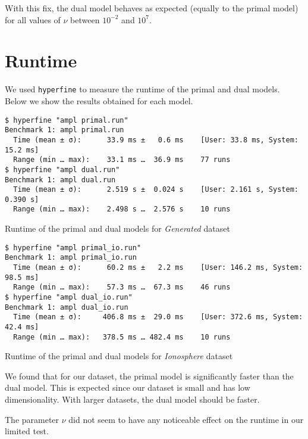 With this fix, the dual model behaves as expected (equally to the primal model)
for all values of $\nu$ between $10^{-2}$ and $10^{7}$.

\section{Runtime}

We used \texttt{hyperfine}%
\cite{peter_hyperfine_2022}
to measure the runtime of the primal and dual models. Below
we show the results obtained for each model.


\begin{listing}[H]
\begin{verbatim}
$ hyperfine "ampl primal.run"
Benchmark 1: ampl primal.run
  Time (mean ± σ):      33.9 ms ±   0.6 ms    [User: 33.8 ms, System: 15.2 ms]
  Range (min … max):    33.1 ms …  36.9 ms    77 runs
$ hyperfine "ampl dual.run"
Benchmark 1: ampl dual.run
  Time (mean ± σ):      2.519 s ±  0.024 s    [User: 2.161 s, System: 0.390 s]
  Range (min … max):    2.498 s …  2.576 s    10 runs
\end{verbatim}
\caption{Runtime of the primal and dual models for \emph{Generated} dataset}
\end{listing}

\begin{listing}[H]
\begin{verbatim}
$ hyperfine "ampl primal_io.run"
Benchmark 1: ampl primal_io.run
  Time (mean ± σ):      60.2 ms ±   2.2 ms    [User: 146.2 ms, System: 98.5 ms]
  Range (min … max):    57.3 ms …  67.3 ms    46 runs
$ hyperfine "ampl dual_io.run"
Benchmark 1: ampl dual_io.run
  Time (mean ± σ):     406.8 ms ±  29.0 ms    [User: 372.6 ms, System: 42.4 ms]
  Range (min … max):   378.5 ms … 482.4 ms    10 runs
\end{verbatim}
\caption{Runtime of the primal and dual models for \emph{Ionosphere} dataset}
\end{listing}

We found that for our dataset, the primal model is
significantly faster than the dual model. This is expected
since our dataset is small and has low dimensionality.
With larger datasets, the dual model should be faster.

The parameter $\nu$ did not seem to have any noticeable effect on the runtime
in our limited test.
